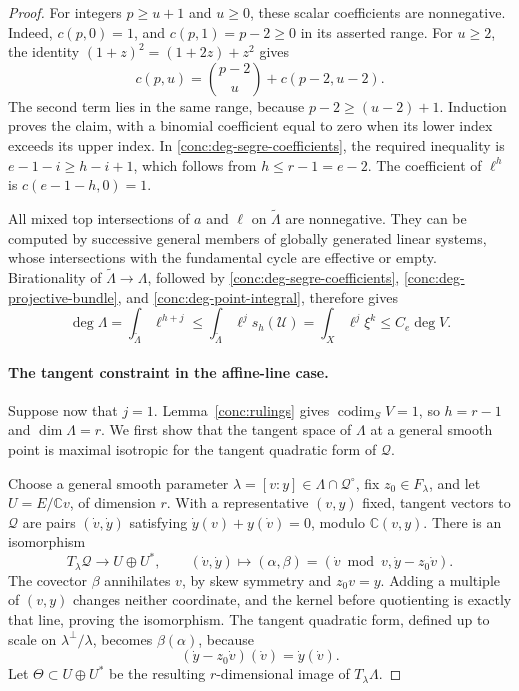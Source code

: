 \begin{proof}
For integers \(p\ge u+1\) and \(u\ge0\), these scalar
coefficients are nonnegative.  Indeed,
\(c(p,0)=1\), and \(c(p,1)=p-2\ge0\) in its asserted
range.  For \(u\ge2\), the identity
\((1+z)^2=(1+2z)+z^2\) gives
\[
 c(p,u)=\binom{p-2}{u}+c(p-2,u-2).
\]
The second term lies in the same range, because
\(p-2\ge(u-2)+1\).  Induction proves the claim, with a
binomial coefficient equal to zero when its lower index exceeds
its upper index.  In \eqref{conc:deg-segre-coefficients}, the
required inequality is
\(e-1-i\ge h-i+1\), which follows from
\(h\le r-1=e-2\).  The coefficient of \(\ell^h\) is
\(c(e-1-h,0)=1\).

All mixed top intersections of \(a\) and \(\ell\) on
\(\widetilde\Lambda\) are nonnegative.  They can be computed
by successive general members of globally generated linear
systems, whose intersections with the fundamental cycle are
effective or empty.  Birationality of
\(\widetilde\Lambda\to\Lambda\), followed by
\eqref{conc:deg-segre-coefficients},
\eqref{conc:deg-projective-bundle}, and
\eqref{conc:deg-point-integral}, therefore gives
\begin{equation}
 \deg\Lambda
 =\int_{\widetilde\Lambda}\ell^{h+j}
 \le\int_{\widetilde\Lambda}\ell^j s_h(\mathcal U)
 =\int_X\ell^j\xi^k
 \le C_e\deg V.
 \label{conc:deg-bound}
\end{equation}

\paragraph{The tangent constraint in the affine-line case.}
Suppose now that \(j=1\).  Lemma~\ref{conc:rulings} gives
\(\operatorname{codim}_S V=1\), so \(h=r-1\) and
\(\dim\Lambda=r\).  We first show that the tangent space of
\(\Lambda\) at a general smooth point is maximal isotropic for
the tangent quadratic form of \(\mathcal Q\).

Choose a general smooth parameter \(\lambda=[v:y]\in
\Lambda\cap\mathcal Q^\circ\), fix \(z_0\in F_\lambda\),
and let \(U=E/\mathbb{C}v\), of dimension \(r\).  With a
representative \((v,y)\) fixed, tangent vectors to \(\mathcal Q\)
are pairs \((\dot v,\dot y)\) satisfying
\(\dot y(v)+y(\dot v)=0\), modulo \(\mathbb{C}(v,y)\).
There is an isomorphism
\begin{equation}
 T_\lambda\mathcal Q\longrightarrow U\oplus U^*,
 \qquad
 (\dot v,\dot y)\longmapsto
 (\alpha,\beta)=(\dot v\bmod v,\dot y-z_0\dot v).
 \label{conc:deg-tangent-coordinates}
\end{equation}
The covector \(\beta\) annihilates \(v\), by skew symmetry
and \(z_0v=y\).  Adding a multiple of \((v,y)\) changes
neither coordinate, and the kernel before quotienting is exactly
that line, proving the isomorphism.  The tangent quadratic form,
defined up to scale on \(\lambda^\perp/\lambda\), becomes
\(\beta(\alpha)\), because
\[
 (\dot y-z_0\dot v)(\dot v)=\dot y(\dot v).
\]
Let \(\Theta\subset U\oplus U^*\) be the resulting
\(r\)-dimensional image of \(T_\lambda\Lambda\).


\end{proof}
